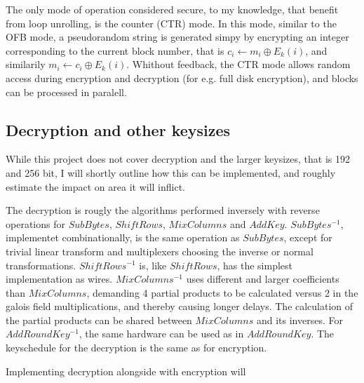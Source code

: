 The only mode of operation considered secure, to my knowledge, that
benefit from loop unrolling, is the counter (CTR) mode. In this mode,
similar to the OFB mode, a pseudorandom string is generated simpy by
encrypting an integer corresponding to the current block number, that
is $c_i \leftarrow m_i \oplus E_k(i)$, and similarily $m_i \leftarrow
c_i \oplus E_k(i)$. Whithout feedback, the CTR mode allows random
access during encryption and decryption (for e.g. full disk
encryption), and blocks can be processed in paralell.

\subsection{Decryption and other keysizes}

While this project does not cover decryption and the larger keysizes,
that is 192 and 256 bit, I will shortly outline how this can be
implemented, and roughly estimate the impact on area it will inflict.

The decryption is rougly the algorithms performed inversely with
reverse operations for $SubBytes$, $ShiftRows$, $MixColumns$ and
$AddKey$. $SubBytes^{-1}$, implementet combinationally, is the same
operation as $SubBytes$, except for trivial linear transform and
multiplexers choosing the inverse or normal
transformations. $ShiftRows^{-1}$ is, like $ShiftRows$, has the
simplest implementation as wires. $MixColumns^{-1}$ uses different and
larger coefficients than $MixColumns$, demanding 4 partial products to
be calculated versus 2 in the galois field multiplications, and
thereby causing longer delays. The calculation of the partial products
can be shared between $MixColumns$ and its inverses. For
$AddRoundKey^{-1}$, the same hardware can be used as in
$AddRoundKey$. The keyschedule for the decryption is the same as for
encryption.

Implementing decryption alongside with encryption will 


